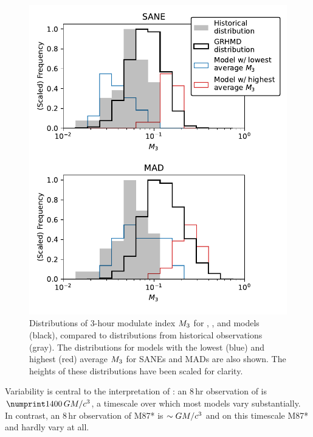 \begin{figure}
  \centering
  \includegraphics[width=\columnwidth]{./figures/mi_hist.pdf}
  \caption{Distributions of 3-hour modulate index $M_{3}$ for \bhac, \kharma, and \hamr models (black), compared to distributions from historical observations (gray).
The distributions for models with the lowest (blue) and highest (red) average $M_{3}$ for SANEs and MADs are also shown.
The heights of these distributions have been scaled for clarity.}
  \label{fig:cmp_ALMA_var}
\end{figure}

Variability is central to  the interpretation of \sgra: an $8\,\mathrm{hr}$ observation of \sgra is $\no{1400}\,\tg$, a timescale over which most models vary substantially.
In contrast, an $8\,\mathrm{hr}$ observation of M87* is $\sim GM/c^3$ and on this timescale M87* and \sgra hardly vary at all.


